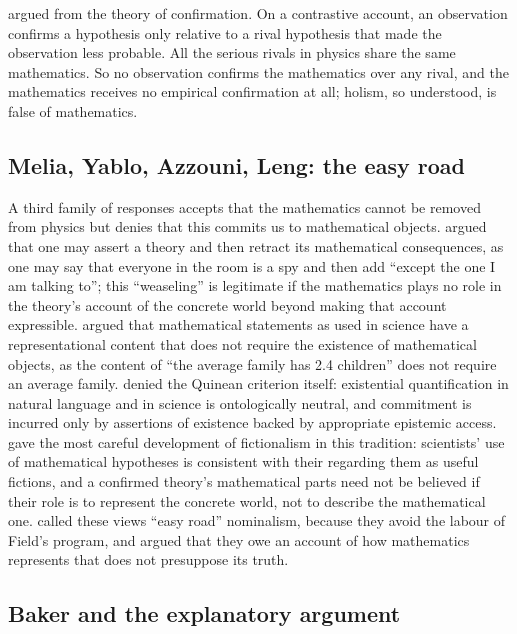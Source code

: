 \documentclass{situationist-preprint}
\begin{document}
\citet{Sober1993} argued from the theory of confirmation. On a contrastive account, an observation confirms a hypothesis only relative to a rival hypothesis that made the observation less probable. All the serious rivals in physics share the same mathematics. So no observation confirms the mathematics over any rival, and the mathematics receives no empirical confirmation at all; holism, so understood, is false of mathematics.

\subsection{Melia, Yablo, Azzouni, Leng: the easy road}

A third family of responses accepts that the mathematics cannot be removed from physics but denies that this commits us to mathematical objects. \citet{Melia2000} argued that one may assert a theory and then retract its mathematical consequences, as one may say that everyone in the room is a spy and then add \enquote{except the one I am talking to}; this \enquote{weaseling} is legitimate if the mathematics plays no role in the theory's account of the concrete world beyond making that account expressible. \citet{Yablo2005} argued that mathematical statements as used in science have a representational content that does not require the existence of mathematical objects, as the content of \enquote{the average family has 2.4 children} does not require an average family. \citet{Azzouni2004} denied the Quinean criterion itself: existential quantification in natural language and in science is ontologically neutral, and commitment is incurred only by assertions of existence backed by appropriate epistemic access. \citet{Leng2010} gave the most careful development of fictionalism in this tradition: scientists' use of mathematical hypotheses is consistent with their regarding them as useful fictions, and a confirmed theory's mathematical parts need not be believed if their role is to represent the concrete world, not to describe the mathematical one. \citet{Colyvan2010} called these views \enquote{easy road} nominalism, because they avoid the labour of Field's program, and argued that they owe an account of how mathematics represents that does not presuppose its truth.

\subsection{Baker and the explanatory argument}
\end{document}
